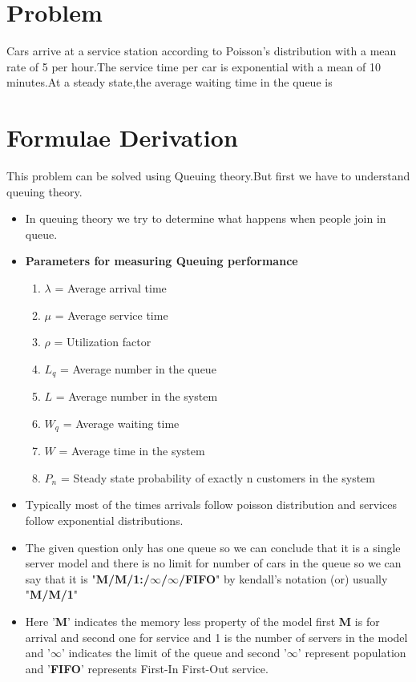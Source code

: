 \documentclass[journal,12pt,twocolumn]{IEEEtran}
\begin{document}
\section{Problem}
Cars arrive at a service station according to Poisson's distribution with a mean rate of 5 per hour.The service time per car is exponential with a mean of 10 minutes.At a steady state,the average waiting time in the queue is 
\section{Formulae Derivation}
This problem can be solved using Queuing theory.But first we have to understand queuing theory.
\begin{itemize}
\item In queuing theory we try to determine what happens when people join in queue.
\item\textbf{Parameters for measuring Queuing performance}
\begin{enumerate}
    \item $\lambda$ = Average arrival time
    \item $\mu$ = Average service time
    \item $\rho$ = Utilization factor
    \item $L_q$ = Average number in the queue
    \item $L$ = Average number in the system
    \item $W_q$ = Average waiting time
    \item $W$ = Average time in the system
    \item $P_n$ = Steady state probability of exactly n customers in the system
\end{enumerate}
\item Typically most of the times arrivals follow poisson distribution and services follow exponential distributions.
\item The given question only has one queue so we can conclude that it is a single server model and there is no limit for number of cars in the queue so we can say that it is "\textbf{M/M/1:/$\infty$/$\infty$/FIFO}" by kendall's notation (or) usually "\textbf{M/M/1}" 
\item Here '\textbf{M}' indicates the memory less property of the model first \textbf{M} is for arrival and second one for service and 1 is the number of servers in the model and '$\infty$' indicates the limit of the queue and second '$\infty$' represent population and '\textbf{FIFO}' represents First-In First-Out service.

\end{itemize}
\end{document}
